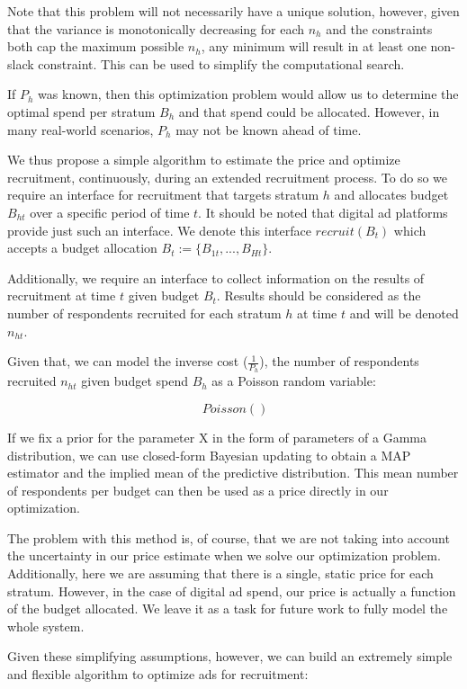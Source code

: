 \message{ !name(survey-sampling-with-ads.tex)}\documentclass[a4paper,12pt]{article}
\theoremstyle{proposition}
\begin{document}
Note that this problem will not necessarily have a unique solution, however, given that the variance is monotonically decreasing for each $n_h$ and the constraints both cap the maximum possible $n_h$, any minimum will result in at least one non-slack constraint. This can be used to simplify the computational search.

If $P_h$ was known, then this optimization problem would allow us to determine the optimal spend per stratum $B_h$ and that spend could be allocated. However, in many real-world scenarios, $P_h$ may not be known ahead of time.

We thus propose a simple algorithm to estimate the price and optimize recruitment, continuously, during an extended recruitment process. To do so we require an interface for recruitment that targets stratum $h$ and allocates budget $B_{ht}$ over a specific period of time $t$. It should be noted that digital ad platforms provide just such an interface. We denote this interface $recruit(B_{t})$ which accepts a budget allocation $B_t := \{B_{1t},...,B_{Ht}\}$.

Additionally, we require an interface to collect information on the results of recruitment at time $t$ given budget $B_t$. Results should be considered as the number of respondents recruited for each stratum $h$ at time $t$ and will be denoted $n_{ht}$.

Given that, we can model the inverse cost ($\frac{1}{P_h}$), the number of respondents recruited $n_{ht}$ given budget spend $B_h$  as a Poisson random variable:

$$
 ~ Poisson()
$$

If we fix a prior for the parameter X in the form of parameters of a Gamma distribution, we can use closed-form Bayesian updating to obtain a MAP estimator and the implied mean of the predictive distribution. This mean number of respondents per budget can then be used as a price directly in our optimization.

The problem with this method is, of course, that we are not taking into account the uncertainty in our price estimate when we solve our optimization problem. Additionally, here we are assuming that there is a single, static price for each stratum. However, in the case of digital ad spend, our price is actually a function of the budget allocated. We leave it as a task for future work to fully model the whole system.

Given these simplifying assumptions, however, we can build an extremely simple and flexible algorithm to optimize ads for recruitment:
\end{document}
